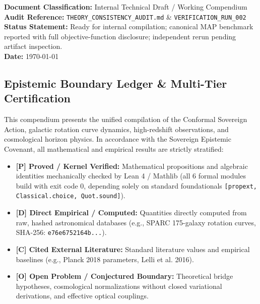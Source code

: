 \documentclass[10pt,letterpaper]{article}
\begin{document}
\thispagestyle{empty}

\begin{tcolorbox}[colback=boxbg, colframe=primary, arc=2mm, width=\textwidth, title={\bfseries\color{white} GRAND MONOGRAPH: TECHNICAL DRAFT STATUS \& EPISTEMIC SCOPE}]
\vspace{0.1em}
\noindent\textbf{Document Classification:} Internal Technical Draft / Working Compendium\\
\textbf{Audit Reference:} \texttt{THEORY\_CONSISTENCY\_AUDIT.md} \& \texttt{VERIFICATION\_RUN\_002}\\
\textbf{Status Statement:} Ready for internal compilation; canonical MAP benchmark reported with full objective-function disclosure; independent rerun pending artifact inspection.\\
\textbf{Date:} \today
\end{tcolorbox}

\vspace{0.5em}

\subsection*{Epistemic Boundary Ledger \& Multi-Tier Certification}

This compendium presents the unified compilation of the Conformal Sovereign Action, galactic rotation curve dynamics, high-redshift observations, and cosmological horizon physics. In accordance with the Sovereign Epistemic Covenant, all mathematical and empirical results are strictly stratified:

\begin{itemize}\setlength\itemsep{0.05em}
    \item \textbf{[P] Proved / Kernel Verified:} Mathematical propositions and algebraic identities mechanically checked by Lean 4 / Mathlib (all 6 formal modules build with exit code 0, depending solely on standard foundationals \texttt{[propext, Classical.choice, Quot.sound]}).
    \item \textbf{[D] Direct Empirical / Computed:} Quantities directly computed from raw, hashed astronomical databases (e.g., SPARC 175-galaxy rotation curves, SHA-256: \texttt{e76e6752164b...}).
    \item \textbf{[C] Cited External Literature:} Standard literature values and empirical baselines (e.g., Planck 2018 parameters, Lelli et al. 2016).
    \item \textbf{[O] Open Problem / Conjectured Boundary:} Theoretical bridge hypotheses, cosmological normalizations without closed variational derivations, and effective optical couplings.
\end{itemize}
\end{document}
